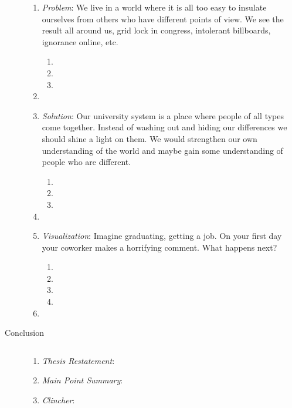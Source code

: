 \documentclass[letterpaper]{article}
\begin{document}
\begin{description}
\begin{enumerate}
  \item
  \emph{Problem}:
  We live in a world where it is all too easy to insulate ourselves from others who have different points of view. We see the result all around us, grid lock in congress, intolerant billboards, ignorance online, etc.
  \begin{enumerate}
    \item
    \item
    \item
  \end{enumerate}
  \renewcommand{\labelenumi}{\emph{Transition}:}
  \item
  \renewcommand{\labelenumi}{\Roman{enumi}}
  \setcounter{enumi}{1}
  \item
  \emph{Solution}:
  Our university system is a place where people of all types come together. Instead of washing out and hiding our differences we should shine a light on them. We would strengthen our own understanding of the world and maybe gain some understanding of people who are different.
  \begin{enumerate}
    \item
    \item
    \item
  \end{enumerate}
  \renewcommand{\labelenumi}{\emph{Transition}:}
  \item
  \renewcommand{\labelenumi}{\Roman{enumi}}
  \setcounter{enumi}{2}
  \item
  \emph{Visualization}:
  Imagine graduating, getting a job. On your first day your coworker makes a horrifying comment. What happens next?
  \begin{enumerate}
    \item
    \item
    \item
    \item
  \end{enumerate}
  \renewcommand{\labelenumi}{\emph{Transition}:}
  \item
  \renewcommand{\labelenumi}{\Roman{enumi}}
\end{enumerate}
\item[Conclusion]$\quad$
\begin{enumerate}
  \item
  \emph{Thesis Restatement}:
  \item
  \emph{Main Point Summary}:
  \item
  \emph{Clincher}:
\end{enumerate}
\end{description}


\newpage


\end{document}

